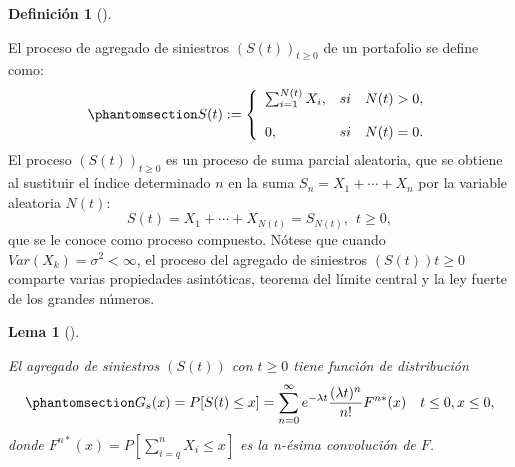 \documentclass[
  us-letterpaper,
]{scrreprt}
\theoremstyle{plain}
\newtheorem{lemma}{Lema}[chapter]
\theoremstyle{plain}
\theoremstyle{definition}
\newtheorem{definition}{Definición}[chapter]
\theoremstyle{remark}
\begin{document}
\begin{definition}[]\protect\hypertarget{def-2}{}\label{def-2}

El proceso de agregado de siniestros \((S(t))_{t \geq 0}\) de un
portafolio se define como:
\begin{equation}\phantomsection\label{eq-1.2}{S(t):= \left\{ \begin{array}{lcc} \sum_{i=1}^{N(t)} X_i, & si & N(t) > 0, \\ \\ 
0, & si & N(t) = 0. \end{array} \right. }\end{equation} El proceso
\((S(t))_{t\geq0}\) es un proceso de suma parcial aleatoria, que se
obtiene al sustituir el índice determinado \(n\) en la suma
\(S_n = X_1 + \dotsb + X_n\) por la variable aleatoria \(N(t):\)
\[S(t) = X_1 + \dotsb+ X_{N(t)} = S_{N(t)}, \ \ t\geq0,\]que se le
conoce como proceso compuesto. Nótese que cuando
\(Var(X_k) = \sigma^2 < \infty\), el proceso del agregado de siniestros
\((S(t))t\ge0\) comparte varias propiedades asintóticas, teorema del
límite central y la ley fuerte de los grandes números.

\end{definition}

\begin{lemma}[]\protect\hypertarget{lem-1}{}\label{lem-1}

El agregado de siniestros \((S(t))\) con \(t \geq 0\) tiene función de
distribución
\begin{equation}\phantomsection\label{eq-1.3}{G_s(x) = P[S(t) \leq x] = \sum_{n=0}^{\infty} e^{-\lambda t}\frac{(\lambda t)^n}{n!}F^{n*}(x) \ \ \ t\leq 0, x \leq 0,}\end{equation}
donde \(F^{n*}(x)= P[\sum_{i=q}^{n} X_i \leq x]\) es la n-ésima
convolución de \(F\).

\end{lemma}
\end{document}
